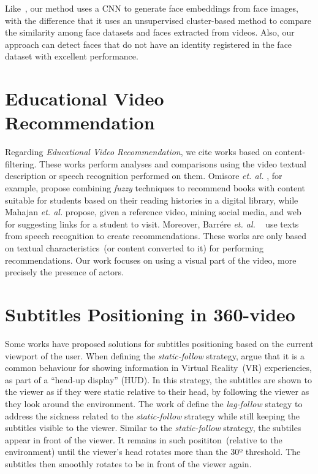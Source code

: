 Like~\cite{globofacestream, yang2017neural, rao2017attention, sohn2017unsupervised}, our method uses a CNN to generate face embeddings from face images, with the difference that it uses an unsupervised cluster-based method to compare the similarity among face datasets and faces extracted from videos. Also, our approach can detect faces that do not have an identity registered in the face dataset with excellent performance.

\section{Educational Video Recommendation}
\label{sec:recommendation}

Regarding \textit{Educational Video Recommendation}, we cite works based on content-filtering.
These works perform analyses and comparisons using the video textual description or speech recognition performed on them. 
Omisore \textit{et. al.} \cite{omisore2014personalized}, for example, propose combining \textit{fuzzy} techniques to recommend books with content suitable for students based on their reading histories in a digital library, while Mahajan \textit{et. al.} \cite{mahajan2015optimising} propose, given a reference video,  mining social media, and web for suggesting links for a student to visit.
Moreover, Barrére \textit{et. al.}
~\cite{barrere2020utilizaccao} use texts from speech recognition to create recommendations.
These works are only based on textual characteristics~(or content converted to it) for performing recommendations.
Our work focuses on using a visual part of the video, more precisely the presence of actors.


\section{Subtitles Positioning in 360-video}
\label{sec:subtitles}

Some works have proposed solutions for subtitles positioning based on the current viewport of the user.
When defining the \emph{static-follow} strategy, \cite{brown_subtitles_2017} argue that it is a common behaviour for showing information in Virtual Reality~(VR) experiencies, as part of a ``head-up display'' (HUD). In this strategy, the subtitles are shown to the viewer as if they were static relative to their head, by following the viewer as they look around the environment. 
The work of \cite{brown_subtitles_2017} define the \emph{lag-follow} stategy to address the sickness related to the \emph{static-follow} strategy while still keeping the subtitles visible to the viewer. Similar to the \emph{static-follow} strategy, the subtiles appear in front of the viewer. It remains in such posititon~(relative to the environment) until the viewer's head rotates more than the 30º threshold. The subtitles then smoothly rotates to be in front of the viewer again. 


